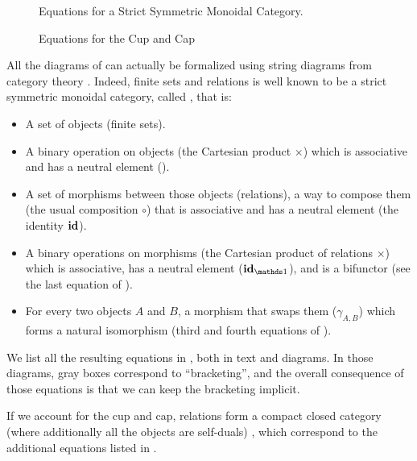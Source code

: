 

\begin{figure*}
	\caption{Equations for a Strict Symmetric Monoidal Category.}
	\label{fig:rel-equations}
\end{figure*}
\begin{figure*}
\caption{Equations for the Cup and Cap}
\label{appfig:rel-equations-cup-cap}
\end{figure*}

All the diagrams of  can actually be formalized using string diagrams from category theory \cite{MacLane}. Indeed, finite sets and relations is well known to be a strict symmetric monoidal category, called , that is:
\begin{itemize}
	\item A set of objects (finite sets).
	\item A binary operation on objects (the Cartesian product $\times$) which is associative and has a neutral element (\one).
	\item A set of morphisms between those objects (relations), a way to compose them (the usual composition $\circ$) that is associative and has a neutral element (the identity $\textbf{\textup{id}}$).
	\item A binary operations on morphisms (the Cartesian product of relations $\times$) which is associative, has a neutral element ($\id_\one$), and is a bifunctor (see the last equation of ).
	\item For every two objects $A$ and $B$, a morphism that swaps them ($\gamma_{A,B}$) which forms a natural isomorphism (third and fourth equations of ).
\end{itemize}
We list all the resulting equations in , both in text and diagrams. In those diagrams, gray boxes correspond to ``bracketing'', and the overall consequence of those equations is that we can keep the bracketing implicit.

If we account for the cup and cap, relations form a compact closed category (where additionally all the objects are self-duals) \cite{KellyLaplaza}, which correspond to the additional equations listed in . 
